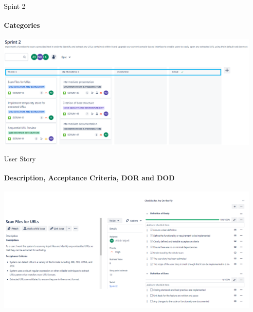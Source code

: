 \documentclass[
    ngerman,%
    authorontitle=true,
]{bfhbeamer}
\begin{document}
    \begin{frame}{Spint 2}
        \framesubtitle{Categories}
        \includegraphics[width=1\textwidth]{pictures/Sprint Backlog 2}
    \end{frame}

    \begin{frame}{User Story}
        \framesubtitle{Description, Acceptance Criteria, DOR and DOD}
        \begin{center}
            \includegraphics[width=1\textwidth]{pictures/User Story 1}
        \end{center}
    \end{frame}
\end{document}
